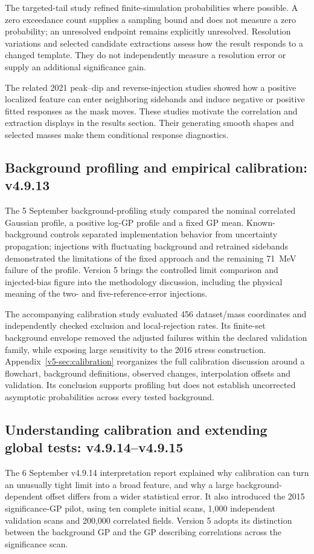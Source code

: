 The targeted-tail study refined finite-simulation probabilities where
possible. A zero exceedance count supplies a sampling bound and does
not measure a zero probability; an unresolved endpoint remains
explicitly unresolved. Resolution variations and selected candidate
extractions assess how the result responds to a changed template.
They do not independently measure a resolution error or supply an
additional significance gain.

The related 2021 peak--dip and reverse-injection studies showed how a
positive localized feature can enter neighboring sidebands and induce
negative or positive fitted responses as the mask moves. These studies
motivate the correlation and extraction displays in the results section.
Their generating smooth shapes and selected masses make them conditional
response diagnostics.

\subsection{Background profiling and empirical calibration: v4.9.13}
The 5 September background-profiling study compared the nominal
correlated Gaussian profile, a positive log-GP profile and a fixed GP
mean. Known-background controls separated implementation behavior from
uncertainty propagation; injections with fluctuating background and
retrained sidebands demonstrated the limitations of the fixed approach
and the remaining 71~MeV failure of the profile.
Version 5 brings the controlled limit comparison and injected-bias figure
into the methodology discussion, including the physical meaning of the
two- and five-reference-error injections.

The accompanying calibration study evaluated 456 dataset/mass
coordinates and independently checked exclusion and local-rejection
rates. Its finite-set background envelope removed the adjusted failures
within the declared validation family, while exposing large sensitivity
to the 2016 stress construction. Appendix~\ref{v5-sec:calibration}
reorganizes the full calibration discussion around a flowchart,
background definitions, observed changes, interpolation offsets and
validation. Its conclusion supports profiling but does not establish
uncorrected asymptotic probabilities across every tested background.

\subsection{Understanding calibration and extending global tests: v4.9.14--v4.9.15}
The 6 September v4.9.14 interpretation report explained why calibration
can turn an unusually tight limit into a broad feature, and why a large
background-dependent offset differs from a wider statistical error.
It also introduced the 2015 significance-GP pilot, using ten complete
initial scans, 1,000 independent validation scans and 200,000 correlated
fields. Version 5 adopts its distinction between the background GP and
the GP describing correlations across the significance scan.

